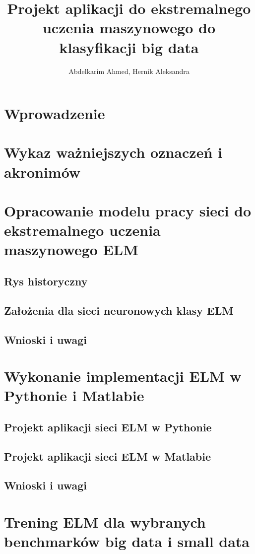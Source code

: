 \documentclass{article}
\title{Projekt aplikacji do ekstremalnego uczenia maszynowego do klasyfikacji big data}
\author{Abdelkarim Ahmed, Hernik Aleksandra}
\date{}
\begin{document}
\maketitle
\tableofcontents

\section*{Wprowadzenie}
\section*{Wykaz ważniejszych oznaczeń i akronimów}
\section{Opracowanie modelu pracy sieci do ekstremalnego uczenia maszynowego ELM}
\subsection{Rys historyczny}
\subsection{Założenia dla sieci neuronowych klasy ELM}
\subsection{Wnioski i uwagi}
\section{Wykonanie implementacji ELM w Pythonie i Matlabie}
\subsection{Projekt aplikacji sieci ELM w Pythonie}
\subsection{Projekt aplikacji sieci ELM w Matlabie}
\subsection{Wnioski i uwagi}
\section{Trening ELM dla wybranych benchmarków big data i small data}
\end{document}
